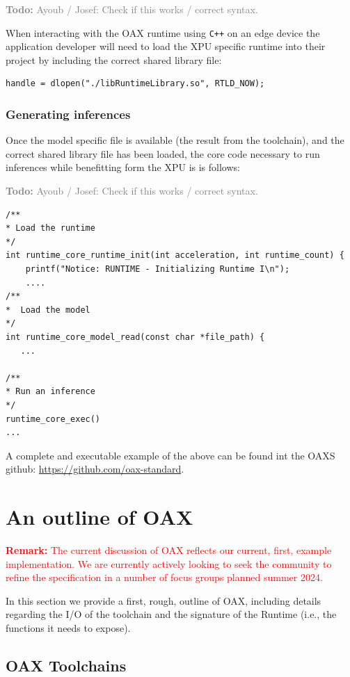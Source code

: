 \documentclass{article}
\newcommand{\todo}[1]{\textcolor{gray}{\textbf{Todo:} #1}}
\newcommand{\remark}[1]{\textcolor{red}{\textbf{\newline Remark:} \newline #1 \newline}}
\newcommand{\oaxgit}{\href{https://github.com/oax-standard}{https://github.com/oax-standard}}
\begin{document}
\todo{Ayoub / Josef: Check if this works / correct syntax.}

When interacting with the OAX runtime using \texttt{C++} on an edge device  the application developer will need to load the XPU specific runtime into their project by including the correct shared library file:

\begin{lstlisting}
handle = dlopen("./libRuntimeLibrary.so", RTLD_NOW);
\end{lstlisting}

\subsubsection{Generating inferences}

Once the model specific file is available (the result from the toolchain), and the correct shared library file has been loaded, the core code necessary to run inferences while benefitting form the XPU is is follows:

\todo{Ayoub / Josef: Check if this works / correct syntax.}

\begin{lstlisting}
/**
* Load the runtime
*/
int runtime_core_runtime_init(int acceleration, int runtime_count) {
    printf("Notice: RUNTIME - Initializing Runtime I\n");
    ....
/**
*  Load the model
*/
int runtime_core_model_read(const char *file_path) {
   ...
   
/**
* Run an inference
*/
runtime_core_exec()
...
\end{lstlisting}

A complete and executable example of the above can be found int the OAXS github: \oaxgit. 

\section{An outline of OAX}
\label{sec:oax-outline}

\remark{The current discussion of OAX reflects our current, first, example implementation. We are currently actively looking to seek the community to refine the specification in a number of focus groups planned summer 2024.}

In this section we provide a first, rough, outline of OAX, including details regarding the I/O of the toolchain and the signature of the Runtime (i.e., the functions it needs to expose).

\subsection{OAX Toolchains}
\end{document}

